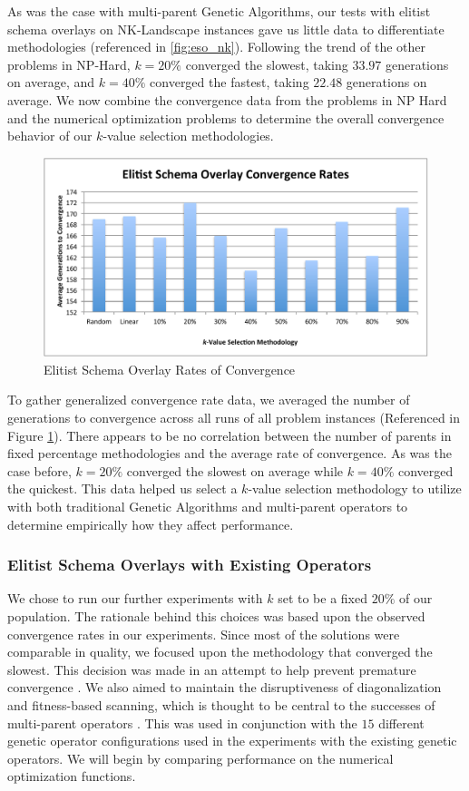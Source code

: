 As was the case with multi-parent Genetic Algorithms, our tests with elitist schema overlays on NK-Landscape instances gave us little data to differentiate methodologies (referenced in \ref{fig:eso_nk}). Following the trend of the other problems in NP-Hard, $k = 20\%$ converged the slowest, taking $33.97$ generations on average, and $k = 40\%$ converged the fastest, taking $22.48$ generations on average. We now combine the convergence data from the problems in NP Hard and the numerical optimization problems to determine the overall convergence behavior of our $k$-value selection methodologies. 

\begin{figure}[htbp!]
\centering
\includegraphics[scale=0.70]{charts/Convergence.pdf}
\caption{Elitist Schema Overlay Rates of Convergence}
\label{fig:eso_convergence}
\end{figure}

To gather generalized convergence rate data, we averaged the number of generations to convergence across all runs of all problem instances (Referenced in Figure \ref{fig:eso_convergence}). There appears to be no correlation between the number of parents in fixed percentage methodologies and the average rate of convergence. As was the case before, $k=20\%$ converged the slowest on average while $k=40\%$ converged the quickest. This data helped us select a $k$-value selection methodology to utilize with both traditional Genetic Algorithms and multi-parent operators to determine empirically how they affect performance.

\subsubsection*{Elitist Schema Overlays with Existing Operators}
We chose to run our further experiments with $k$ set to be a fixed $20\%$ of our population. The rationale behind this choices was based upon the observed convergence rates in our experiments. Since most of the solutions were comparable in quality, we focused upon the methodology that converged the slowest. This decision was made in an attempt to help prevent premature convergence \cite{Andre01}. We also aimed to maintain the disruptiveness of diagonalization and fitness-based scanning, which is thought to be central to the successes of multi-parent operators \cite{Eiben95}. This was used in conjunction with the $15$ different genetic operator configurations used in the experiments with the existing genetic operators. We will begin by comparing performance on the numerical optimization functions.

